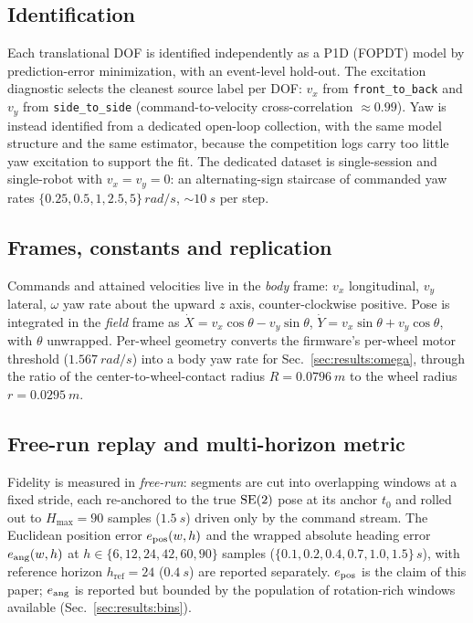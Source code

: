 \subsection{Identification}
\label{sec:method:id}
Each translational DOF is identified independently as a P1D (FOPDT) model by prediction-error minimization, with an event-level hold-out. The excitation diagnostic selects the cleanest source label per DOF: $v_x$ from \texttt{front\_to\_back} and $v_y$ from \texttt{side\_to\_side} (command-to-velocity cross-correlation $\approx 0.99$).
Yaw is instead identified from a dedicated open-loop collection, with the same model structure and the same estimator, because the competition logs carry too little yaw excitation to support the fit. The dedicated dataset is single-session and single-robot with $v_x=v_y=0$: an alternating-sign staircase of commanded yaw rates $\{0.25,0.5,1,2.5,5\}\,\si{rad/s}$, $\sim\SI{10}{s}$ per step.

\subsection{Frames, constants and replication}
\label{sec:method:geometry}
Commands and attained velocities live in the \emph{body} frame: $v_x$ longitudinal, $v_y$ lateral, $\omega$ yaw rate about the upward $z$ axis, counter-clockwise positive. Pose is integrated in the \emph{field} frame as $\dot{X} = v_x\cos\theta - v_y\sin\theta$, $\dot{Y} = v_x\sin\theta + v_y\cos\theta$, with $\theta$ unwrapped.
Per-wheel geometry converts the firmware's per-wheel motor threshold ($\SI{1.567}{rad/s}$) into a body yaw rate for Sec.~\ref{sec:results:omega}, through the ratio of the center-to-wheel-contact radius $R=\SI{0.0796}{m}$ to the wheel radius $r=\SI{0.0295}{m}$.

\subsection{Free-run replay and multi-horizon metric}
\label{sec:method:metric}
Fidelity is measured in \emph{free-run}: segments are cut into overlapping windows at a fixed stride, each re-anchored to the true $\mathrm{SE}(2)$ pose at its anchor $t_0$ and rolled out to $H_{\max}=90$ samples ($\SI{1.5}{s}$) driven only by the command stream. The Euclidean position error $e_{\mathrm{pos}}(w,h)$ and the wrapped absolute heading error $e_{\mathrm{ang}}(w,h)$ at $h\in\{6,12,24,42,60,90\}$ samples ($\{0.1,0.2,0.4,0.7,1.0,1.5\}\,\si{s}$), with reference horizon $h_{\mathrm{ref}}=24$ ($\SI{0.4}{s}$) are reported separately. $e_{\mathrm{pos}}$ is the claim of this paper; $e_{\mathrm{ang}}$ is reported but bounded by the population of rotation-rich windows available (Sec.~\ref{sec:results:bins}).

